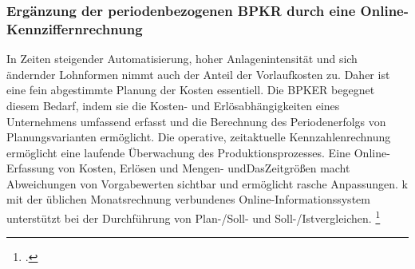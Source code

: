 \subsubsection{Ergänzung der periodenbezogenen BPKR durch eine Online-Kennziffernrechnung}

In Zeiten steigender Automatisierung, hoher Anlagenintensität und sich ändernder Lohnformen nimmt auch der Anteil der Vorlaufkosten zu. Daher ist eine fein abgestimmte Planung der Kosten essentiell. Die BPKER begegnet diesem Bedarf, indem sie die Kosten- und Erlösabhängigkeiten eines Unternehmens umfassend erfasst und die Berechnung des Periodenerfolgs von Planungsvarianten ermöglicht. Die operative, zeitaktuelle Kennzahlenrechnung ermöglicht eine laufende Überwachung des Produktionsprozesses. Eine Online-Erfassung von Kosten, Erlösen und Mengen- undDasZeitgrö{\ss}en macht Abweichungen von Vorgabewerten sichtbar und ermöglicht rasche Anpassungen. k mit der üblichen Monatsrechnung verbundenes Online-Informationssystem unterstützt bei der Durchführung von Plan-/Soll- und Soll-/Istvergleichen. \footcite[Vgl.][S. 310ff]{Artikel_orginal}

